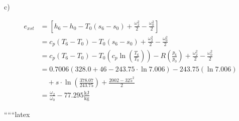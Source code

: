 c)

\begin{align*}
e_{xst} &= \left[ h_6 - h_0 - T_0 (s_6 - s_0) + \frac{\omega_2^2}{2} - \frac{\omega_0^2}{2} \right] \\
&= c_p (T_6 - T_0) - T_0 (s_6 - s_0) + \frac{\omega_2^2}{2} - \frac{\omega_0^2}{2} \\
&= c_p (T_6 - T_0) - T_0 \left( c_p \ln \left( \frac{T_6}{T_0} \right) \right) - R \left( \frac{p_6}{p_0} \right) + \frac{\omega_2^2}{2} - \frac{\omega_0^2}{2} \\
&= 0.7006 (328.0 + 46 - 243.75 \cdot \ln 7.006) - 243.75 \left( \ln 7.006 \right) \\
&\quad + s \cdot \ln \left( \frac{378.07}{243.75} \right) + \frac{2002 - 325^2}{2} \\
&= \frac{\omega_2}{\omega_0} - 77.295 \frac{\text{kJ}}{\text{kg}}
\end{align*}

``````latex
